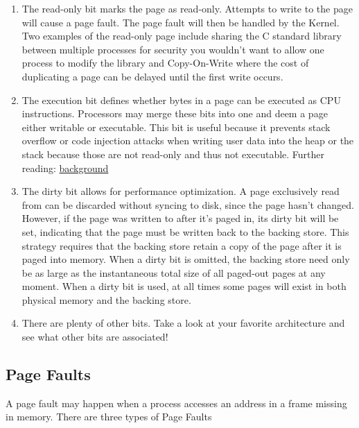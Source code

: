 \begin{enumerate}
	\item The read-only bit marks the page as read-only.
	      Attempts to write to the page will cause a page fault.
	      The page fault will then be handled by the Kernel.
	      Two examples of the read-only page include sharing the C standard library between multiple processes for security you wouldn't want to allow one process to modify the library and Copy-On-Write where the cost of duplicating a page can be delayed until the first write occurs.
	      	 
	\item The execution bit defines whether bytes in a page can be executed as CPU instructions.
	      Processors may merge these bits into one and deem a page either writable or executable.
	      This bit is useful because it prevents stack overflow or code injection attacks when writing user data into the heap or the stack because those are not read-only and thus not executable.
	      Further reading: \href{http://en.wikipedia.org/wiki/NX\_bit\#Hardware\_background}{background}
	      	 
	\item The dirty bit allows for performance optimization.
	      A page exclusively read from can be discarded without syncing to disk, since the page hasn't changed.
	      However, if the page was written to after it's paged in, its dirty bit will be set, indicating that the page must be written back to the backing store.
	      This strategy requires that the backing store retain a copy of the page after it is paged into memory.
	      When a dirty bit is omitted, the backing store need only be as large as the instantaneous total size of all paged-out pages at any moment.
	      When a dirty bit is used, at all times some pages will exist in both physical memory and the backing store.
	\item There are plenty of other bits. Take a look at your favorite architecture and see what other bits are associated!
\end{enumerate}
	 
\subsection{Page Faults}
	 
A page fault may happen when a process accesses an address in a frame missing in memory.
There are three types of Page Faults
	 
